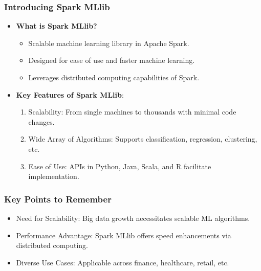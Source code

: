 \documentclass[aspectratio=169]{beamer}
\begin{document}
\begin{frame}[fragile]
    \frametitle{Introducing Spark MLlib}
    \begin{itemize}
        \item \textbf{What is Spark MLlib?}
            \begin{itemize}
                \item Scalable machine learning library in Apache Spark.
                \item Designed for ease of use and faster machine learning.
                \item Leverages distributed computing capabilities of Spark.
            \end{itemize}
        
        \item \textbf{Key Features of Spark MLlib}:
            \begin{enumerate}
                \item Scalability: From single machines to thousands with minimal code changes.
                \item Wide Array of Algorithms: Supports classification, regression, clustering, etc.
                \item Ease of Use: APIs in Python, Java, Scala, and R facilitate implementation.
            \end{enumerate}
    \end{itemize}
\end{frame}

\begin{frame}[fragile]
    \frametitle{Key Points to Remember}
    \begin{itemize}
        \item Need for Scalability: Big data growth necessitates scalable ML algorithms.
        \item Performance Advantage: Spark MLlib offers speed enhancements via distributed computing.
        \item Diverse Use Cases: Applicable across finance, healthcare, retail, etc.
    \end{itemize}
\end{frame}
\end{document}
